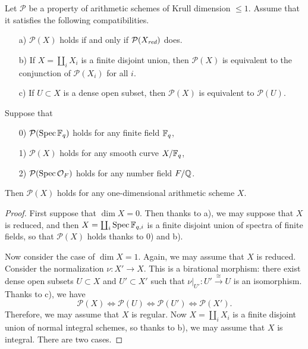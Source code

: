 \documentclass{article}
\numberwithin{equation}{section}
\begin{document}
\begin{lemma}
  \label{lemma:devissage}
  Let $\mathcal{P}$ be a property of arithmetic schemes of Krull dimension
  $\le 1$. Assume that it satisfies the following compatibilities.
  \begin{enumerate}
  \item[a)] $\mathcal{P} (X)$ holds if and only if $\mathcal{P} (X_{\text{\it red}})$ does.

  \item[b)] If $X = \coprod_i X_i$ is a finite disjoint union, then
    $\mathcal{P} (X)$ is equivalent to the conjunction of $\mathcal{P} (X_i)$ for
    all $i$.

  \item[c)] If $U \subset X$ is a dense open subset, then $\mathcal{P} (X)$
    is equivalent to $\mathcal{P} (U)$.
  \end{enumerate}
  Suppose that
  \begin{enumerate}
  \item[0)] $\mathcal{P} (\operatorname{Spec} \mathbb{F}_q)$ holds for any finite field $\mathbb{F}_q$,

  \item[1)] $\mathcal{P} (X)$ holds for any smooth curve $X/\mathbb{F}_q$,

  \item[2)] $\mathcal{P} (\operatorname{Spec} \mathcal{O}_F)$ holds for any number field
    $F/\mathbb{Q}$.
  \end{enumerate}
  Then $\mathcal{P} (X)$ holds for any one-dimensional arithmetic scheme $X$.

  \begin{proof}
    First suppose that $\dim X = 0$. Then thanks to a), we may suppose that $X$
    is reduced, and then $X = \coprod_i \operatorname{Spec} \mathbb{F}_{q,i}$ is a finite disjoint
    union of spectra of finite fields, so that $\mathcal{P} (X)$ holds thanks to
    0) and b).

    Now consider the case of $\dim X = 1$. Again, we may assume that $X$ is
    reduced. Consider the normalization $\nu\colon X' \to X$. This is a
    birational morphism: there exist dense open subsets $U \subset X$ and
    $U' \subset X'$ such that
    $\left.\nu\right|_{U'}\colon U' \xrightarrow{\cong} U$ is an
    isomorphism. Thanks to c), we have
    \[ \mathcal{P} (X) \iff
      \mathcal{P} (U) \iff
      \mathcal{P} (U') \iff
      \mathcal{P} (X'). \]
    Therefore, we may assume that $X$ is regular. Now $X = \coprod_i X_i$ is a
    finite disjoint union of normal integral schemes, so thanks to b), we may
    assume that $X$ is integral. There are two cases.


\end{proof}
\end{lemma}
\end{document}
